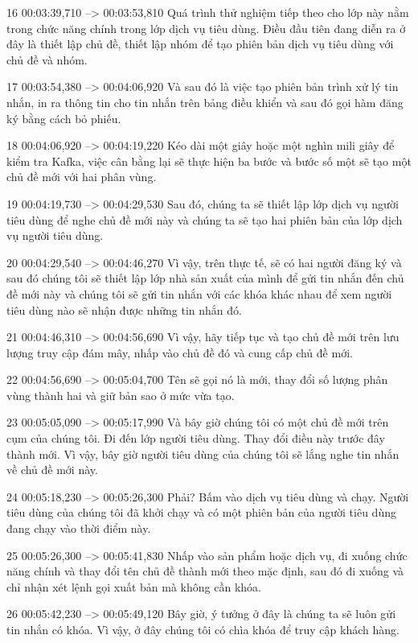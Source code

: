 16
00:03:39,710 --> 00:03:53,810
Quá trình thử nghiệm tiếp theo cho lớp này nằm trong chức năng chính trong lớp dịch vụ tiêu dùng.  Điều đầu tiên đang diễn ra ở đây là thiết lập chủ đề, thiết lập nhóm để tạo phiên bản dịch vụ tiêu dùng với chủ đề và nhóm.

17
00:03:54,380 --> 00:04:06,920
Và sau đó là việc tạo phiên bản trình xử lý tin nhắn, in ra thông tin cho tin nhắn trên bảng điều khiển và sau đó gọi hàm đăng ký bằng cách bỏ phiếu.

18
00:04:06,920 --> 00:04:19,220
Kéo dài một giây hoặc một nghìn mili giây để kiểm tra Kafka, việc cân bằng lại sẽ thực hiện ba bước và bước số một sẽ tạo một chủ đề mới với hai phân vùng.

19
00:04:19,730 --> 00:04:29,530
Sau đó, chúng ta sẽ thiết lập lớp dịch vụ người tiêu dùng để nghe chủ đề mới này và chúng ta sẽ tạo hai phiên bản của lớp dịch vụ người tiêu dùng.

20
00:04:29,540 --> 00:04:46,270
Vì vậy, trên thực tế, sẽ có hai người đăng ký và sau đó chúng tôi sẽ thiết lập lớp nhà sản xuất của mình để gửi tin nhắn đến chủ đề mới này và chúng tôi sẽ gửi tin nhắn với các khóa khác nhau để xem người tiêu dùng nào sẽ nhận được những tin nhắn đó.

21
00:04:46,310 --> 00:04:56,690
Vì vậy, hãy tiếp tục và tạo chủ đề mới trên lưu lượng truy cập đám mây, nhấp vào chủ đề đó và cung cấp chủ đề mới.

22
00:04:56,690 --> 00:05:04,700
Tên sẽ gọi nó là mới, thay đổi số lượng phân vùng thành hai và giữ bản sao ở mức vừa tạo.

23
00:05:05,090 --> 00:05:17,990
Và bây giờ chúng tôi có một chủ đề mới trên cụm của chúng tôi.  Đi đến lớp người tiêu dùng.  Thay đổi điều này trước đây thành mới.  Vì vậy, bây giờ người tiêu dùng của chúng tôi sẽ lắng nghe tin nhắn về chủ đề mới này.

24
00:05:18,230 --> 00:05:26,300
Phải?  Bấm vào dịch vụ tiêu dùng và chạy.  Người tiêu dùng của chúng tôi đã khởi chạy và có một phiên bản của người tiêu dùng đang chạy vào thời điểm này.

25
00:05:26,300 --> 00:05:41,830
Nhấp vào sản phẩm hoặc dịch vụ, đi xuống chức năng chính và thay đổi tên chủ đề thành mới theo mặc định, sau đó đi xuống và chỉ nhận xét lệnh gọi xuất bản mà không cần khóa.

26
00:05:42,230 --> 00:05:49,120
Bây giờ, ý tưởng ở đây là chúng ta sẽ luôn gửi tin nhắn có khóa.  Vì vậy, ở đây chúng tôi có chìa khóa để truy cập khách hàng.

